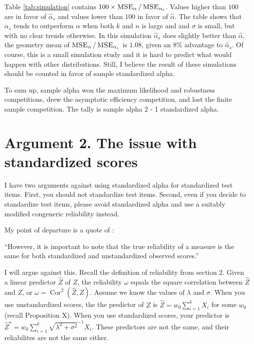 \documentclass{article}
\theoremstyle{plain}
\theoremstyle{plain}
\theoremstyle{definition}
\theoremstyle{remark}
\theoremstyle{definition}
\theoremstyle{plain}
\theoremstyle{plain}
\theoremstyle{definition}
\DeclareMathOperator{\Cor}{Cor}
\DeclareMathOperator{\MSE}{\textsc{MSE}}
\begin{document}
Table \ref{tab:simulation} contains $100 \times \MSE_\alpha/\MSE_{\alpha_s}$. Values higher than $100$ are in favor of $\widehat{\alpha}_s$ and values lower than $100$ in favor of $\widehat{\alpha}$. The table shows that $\alpha_s$ tends to outperform $\alpha$ when both $k$ and $n$ is large and and $\sigma$ is small, but with no clear trends otherwise. In this simulation $\widehat{\alpha}_s$ does slightly better than $\widehat{\alpha}$, the geometry mean of $\MSE_\alpha/\MSE_{\alpha_s}$ is $1.08$, given an $8$\% advantage to $\widehat{\alpha}_s$. Of course, this is a small simulation study and it is hard to predict what would happen with other distributions. Still, I believe the result of these simulations should be counted in favor of sample standardized alpha.

To sum up, sample alpha won the maximum likelihood and robustness competitions, drew the asymptotic efficiency competition, and lost the finite sample competition. The tally is sample alpha 2 - 1 standardized alpha. 



\section{Argument 2. The issue with standardized scores}
\label{sec:argument 2}
I have two arguments against using standardized alpha for standardized
test items. First, you should not standardize test items. Second,
even if you decide to standardize test items, please avoid standardized
alpha and use a suitably modified congeneric reliability instead.

My point of departure is a quote of \citet[][p.348]{Osburn2000-jd}:

\enquote{However, it is important to note that the true reliability of a measure is the same for both standardized and unstandardized observed scores.}

I will argue against this. Recall the definition of reliability from
section $2$. Given a linear predictor $\hat{Z}$ of $Z$, the
reliability $\omega$ equals the square correlation between $\hat{Z}$
and $Z$, or $\omega=\Cor^{2}(\hat{Z},Z)$. Assume
we know the values of $\lambda$ and $\sigma$. When you use unstandardized
scores, the the predictor of $Z$ is $\hat{Z}=w_{0}\sum_{i=1}^{k}X_{i}$
for some $w_{0}$ (recall Proposition X). When you use standardized
scores, your predictor is $\hat{Z}^{\star}=w_{0}\sum_{i=1}^{k}\sqrt{\lambda^{2}+\sigma^{2}}^{-1}X_{i}$.
These predictors are not the same, and their reliabilites are not
the same either.
\end{document}
